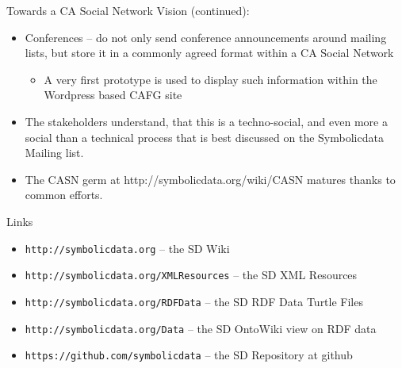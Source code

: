 \documentclass{beamer}
\begin{document}
\begin{frame}{Towards a CA Social Network}{}
Vision (continued):
\begin{itemize}
\item Conferences -- do not only send conference announcements around mailing
  lists, but store it in a commonly agreed format within a CA Social Network
\begin{itemize}
\item A very first prototype is used to display such information within the
  Wordpress based CAFG site
\end{itemize}
\item The stakeholders understand, that this is a techno-social, and even more
  a social than a technical process that is best discussed on the Symbolicdata
  Mailing list.
\item The CASN germ at http://symbolicdata.org/wiki/CASN matures thanks to
  common efforts.
\end{itemize}
\end{frame}

\begin{frame}{Links}{}\small
\begin{itemize}
\item \texttt{http://symbolicdata.org} -- the SD Wiki
\item \texttt{http://symbolicdata.org/XMLResources} -- the SD XML Resources
\item \texttt{http://symbolicdata.org/RDFData} -- the SD RDF Data Turtle Files
\item \texttt{http://symbolicdata.org/Data} -- the SD OntoWiki view on RDF
  data
\item \texttt{https://github.com/symbolicdata} -- the SD Repository at github
\end{itemize}
\end{frame}
\end{document}
